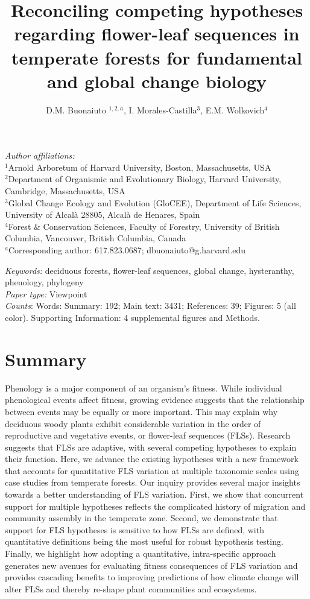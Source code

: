 \documentclass[11pt]{article}
\title{Reconciling competing hypotheses regarding flower-leaf sequences in temperate forests for fundamental and global change biology}
\date{}
\author{D.M. Buonaiuto $^{1,2,a}$, I. Morales-Castilla$^{3}$, E.M. Wolkovich$^{4}$}
\begin{document}
\maketitle

\noindent \emph{Author affiliations:}\\
\noindent $^1$Arnold Arboretum of Harvard University, Boston, Massachusetts, USA\\
$^2$Department of Organismic and Evolutionary Biology, Harvard University, Cambridge, Massachusetts, USA\\
$^3$Global Change Ecology and Evolution (GloCEE), Department of Life Sciences, University of Alcal\`a  28805, Alcal\`a de Henares, Spain\\
$^4$Forest \& Conservation Sciences, Faculty of Forestry, University of British Columbia, Vancouver, British Columbia, Canada\\
$^a$Corresponding author: 617.823.0687; dbuonaiuto@g.harvard.edu

\noindent \emph{Keywords:} deciduous forests, flower-leaf sequences, global change, hysteranthy, phenology, phylogeny \\ %
\emph{Paper type:} Viewpoint\\
 \emph{Counts}: Words: Summary: 192; Main text: 3431; References: 39;  Figures: 5 (all color). Supporting Information: 4 supplemental figures and Methods.
\newpage

\section*{Summary}
Phenology is a major component of an organism's fitness. While individual phenological events affect fitness, growing evidence suggests that the relationship between events may be equally or more important. This may explain why deciduous woody plants exhibit considerable variation in the order of reproductive and vegetative events, or flower-leaf sequences (FLSs). Research suggests that FLSs are adaptive, with several competing hypotheses to explain their function. Here, we advance the existing hypotheses with a new framework that accounts for quantitative FLS variation at multiple taxonomic scales using case studies from temperate forests. Our inquiry provides several major insights towards a better understanding of FLS variation. First, we show that %
concurrent support for multiple hypotheses reflects the complicated history of migration and community assembly in the temperate zone. Second, we demonstrate that support for FLS hypotheses is sensitive to how FLSs are defined, with quantitative definitions being the most useful for robust hypothesis testing. Finally, we highlight how adopting a quantitative, intra-specific approach generates new avenues for evaluating fitness consequences of FLS variation and provides cascading benefits to improving predictions of how climate change will alter FLSs and thereby re-shape plant communities and ecosystems.
\end{document}
